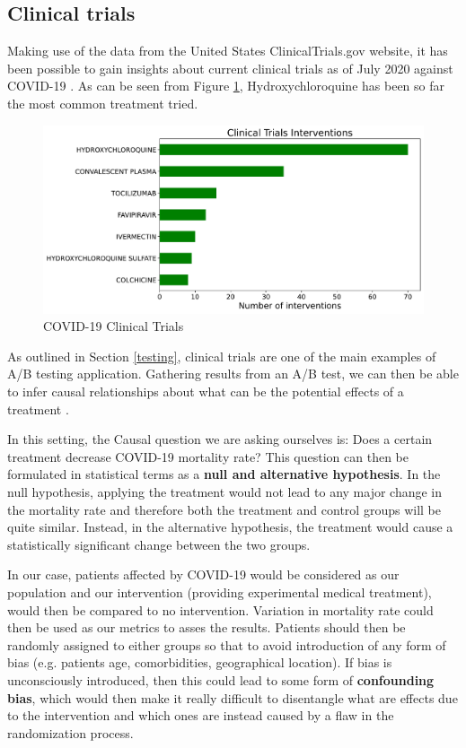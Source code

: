 \begin{appendices}
\section{Clinical trials}
\label{ab_trials}
Making use of the data from the United States ClinicalTrials.gov website, it has been possible to gain insights about current clinical trials as of July 2020 against COVID-19 \cite{trials_data}. As can be seen from Figure \ref{trials}, Hydroxychloroquine has been so far the most common treatment tried.
\vspace{-0.2cm}
\begin{figure}[ht!]%
    \centering
    \includegraphics[width=0.65\linewidth]{latex/images/trials.pdf}
    \vspace{-0.2cm}
    \caption{COVID-19 Clinical Trials}
    \label{trials}
\end{figure}
\vspace{-0.2cm}

As outlined in Section \ref{testing}, clinical trials are one of the main examples of A/B testing application. Gathering results from an A/B test, we can then be able to infer causal relationships about what can be the potential effects of a treatment \cite{power}.

In this setting, the Causal question we are asking ourselves is: Does a certain treatment decrease COVID-19 mortality rate? This question can then be formulated in statistical terms as a \textbf{null and alternative hypothesis}. In the null hypothesis, applying the treatment would not lead to any major change in the mortality rate and therefore both the treatment and control groups will be quite similar. Instead, in the alternative hypothesis, the treatment would cause a statistically significant change between the two groups. 

In our case, patients affected by COVID-19 would be considered as our population and our intervention (providing experimental medical treatment), would then be compared to no intervention. Variation in mortality rate could then be used as our metrics to asses the results. Patients should then be randomly assigned to either groups so that to avoid introduction of any form of bias (e.g. patients age, comorbidities, geographical location). If bias is unconsciously introduced, then this could lead to some form of \textbf{confounding bias}, which would then make it really difficult to disentangle what are effects due to the intervention and which ones are instead caused by a flaw in the randomization process. 


\end{appendices}
